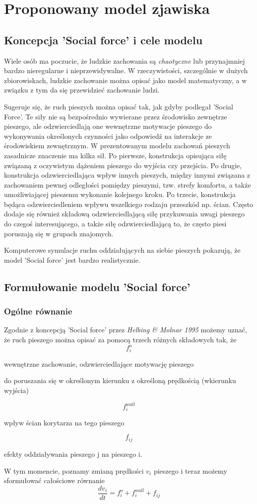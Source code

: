\chapter{Proponowany model zjawiska}
\section{Koncepcja ’Social force’ i cele modelu}
\hspace{4ex}Wiele osób ma poczucie, że ludzkie zachowania są {\it chaotyczne} lub przynajmniej bardzo nieregularne i nieprzewidywalne. W rzeczywistości, szczególnie w dużych zbiorowiskach, ludzkie zachowanie można opisać jako model matematyczny, a w związku z tym da się przewidzieć zachowanie ludzi.
\par \medskip
Sugeruje się, że ruch pieszych można opisać tak, jak gdyby podlegał 'Social Force'. Te siły nie są bezpośrednio wywierane przez środowisko zewnętrze pieszego, ale odzwierciedlają one wewnętrzne motywacje pieszego do wykonywania określonych czynności jako odpowiedź na interakcje ze środowiskiem zewnętrznym. W prezentowanym modelu zachowań pieszych zasadnicze znaczenie ma kilka sił. Po pierwsze, konstrukcja opisująca siłę związaną z oczywistym dążeniem pieszego do wyjścia czy przejścia. Po drugie, konstrukcja odzwierciedlająca wpływ innych pieszych, między innymi związana z zachowaniem pewnej odległości pomiędzy pieszymi, tzw. strefy komfortu, a także umożliwiającej pieszemu wykonanie kolejnego kroku. Po trzecie, konstrukcja będąca odzwierciedleniem wpływu wszelkiego rodzaju przeszkód np. ścian. Często dodaje się również składową odzwierciedlającą siłę przykuwania uwagi pieszego do czegoś interesującego, a także siłę odzwierciedlającą to, że często piesi poruszają się w grupach znajomych.

Komputerowe symulacje ruchu oddziałujących na siebie pieszych pokazują, że model 'Social force' jest bardzo realistycznie.
\section{Formułowanie modelu 'Social force'}
\subsection{Ogólne równanie}
\hspace{4ex}Zgodnie z koncepcją 'Social force' przez {\it Helbing \& Molnar 1995} możemy uznać, że ruch pieszego można opisać za pomocą trzech różnych składowych tak, że 
$$f_{i}^{o}$$  \centerline{wewnętrzne zachowanie, odzwierciedlające motywację pieszego} \centerline{do poruszania się w określonym kierunku z określoną prędkością (wkierunku wyjścia)} 
$$f_{i}^{wall}$$ \centerline{wpływ ścian korytarza na tego pieszego}
$$f_{ij}$$ \centerline{efekty oddziaływania pieszego j na pieszego i.}
\par \medskip W tym momencie, poznamy zmianą prędkości $v_{i}$ pieszego i teraz możemy sformułować całościowe równanie
$$
\frac{dv_{i}}{dt} = f_{i}^{o} + f_{i}^{wall} + f_{ij}
$$
